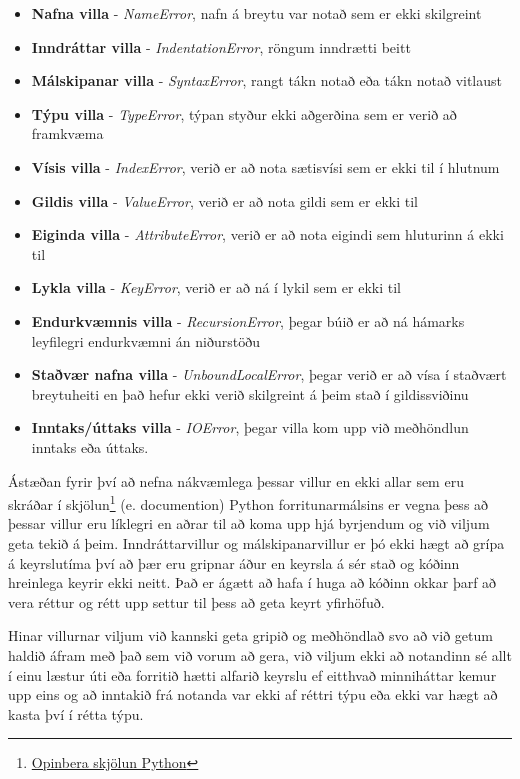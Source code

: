 \begin{itemize}
	\item \textbf{Nafna villa} - \emph{NameError}, nafn á breytu var notað sem er ekki skilgreint
	\item \textbf{Inndráttar villa }- \emph{IndentationError}, röngum inndrætti beitt
	\item \textbf{Málskipanar villa} - \emph{SyntaxError}, rangt tákn notað eða tákn notað vitlaust
	\item \textbf{Týpu villa} - \emph{TypeError}, týpan styður ekki aðgerðina sem er verið að framkvæma
	\item \textbf{Vísis villa} - \emph{IndexError}, verið er að nota sætisvísi sem er ekki til í hlutnum
	\item \textbf{Gildis villa} - \emph{ValueError}, verið er að nota gildi sem er ekki til
	\item \textbf{Eiginda villa} - \emph{AttributeError}, verið er að nota eigindi sem hluturinn á ekki til
	\item \textbf{Lykla villa} - \emph{KeyError}, verið er að ná í lykil sem er ekki til
	\item \textbf{Endurkvæmnis villa} - \emph{RecursionError}, þegar búið er að ná hámarks leyfilegri endurkvæmni án niðurstöðu
	\item \textbf{Staðvær nafna villa} - \emph{UnboundLocalError}, þegar verið er að vísa í staðvært breytuheiti en það hefur ekki verið skilgreint á þeim stað í gildissviðinu
	\item \textbf{Inntaks/úttaks villa} - \emph{IOError}, þegar villa kom upp við meðhöndlun inntaks eða úttaks.
\end{itemize}
\vspace{0.5cm}
Ástæðan fyrir því að nefna nákvæmlega þessar villur en ekki allar sem eru skráðar í skjölun\footnote{\href{https://docs.python.org/}{Opinbera skjölun Python}} (e. documention) Python forritunarmálsins er vegna þess að þessar villur eru líklegri en aðrar til að koma upp hjá byrjendum og við viljum geta tekið á þeim.
Inndráttarvillur og málskipanarvillur er þó ekki hægt að grípa á keyrslutíma því að þær eru gripnar áður en keyrsla á sér stað og kóðinn hreinlega keyrir ekki neitt.
Það er ágætt að hafa í huga að kóðinn okkar þarf að vera réttur og rétt upp settur til þess að geta keyrt yfirhöfuð.

Hinar villurnar viljum við kannski geta gripið og meðhöndlað svo að við getum haldið áfram með það sem við vorum að gera, við viljum ekki að notandinn sé allt í einu læstur úti eða forritið hætti alfarið keyrslu ef eitthvað minniháttar kemur upp eins og að inntakið frá notanda var ekki af réttri týpu eða ekki var hægt að kasta því í rétta týpu.

